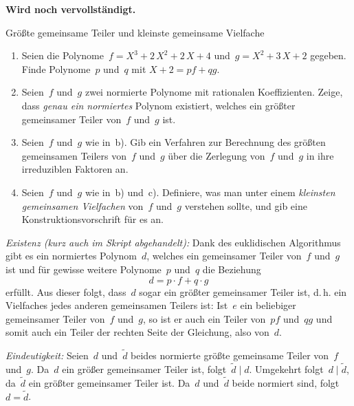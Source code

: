\documentclass{algblatt}
\begin{document}
\vspace*{-1.5cm}
\vspace*{-0.3cm}

\ifloesungen\begin{center}\textbf{Wird noch vervollständigt.}\end{center}\fi

\begin{aufgabe}{Größte gemeinsame Teiler und kleinste gemeinsame Vielfache}
\begin{enumerate}
\item Seien die Polynome~$f = X^3 + 2\,X^2 + 2\,X + 4$
und~$g = X^2 + 3\,X + 2$ gegeben. Finde Polynome~$p$ und~$q$ mit
$X+2 = p f + q g$.
\item Seien~$f$ und~$g$ zwei normierte Polynome mit rationalen
Koeffizienten. Zeige, dass \emph{genau ein normiertes} Polynom existiert, welches ein
größter gemeinsamer Teiler von~$f$ und~$g$ ist.
\item Seien~$f$ und~$g$ wie in~b).
Gib ein Verfahren zur Berechnung des größten gemeinsamen Teilers
von~$f$ und~$g$ über die Zerlegung von~$f$ und~$g$ in ihre
irreduziblen Faktoren an.
\item Seien~$f$ und~$g$ wie in~b) und~c). Definiere, was man unter einem
\emph{kleinsten gemeinsamen Vielfachen} von~$f$ und~$g$ verstehen sollte,
und gib eine Konstruktionsvorschrift für es an.
\end{enumerate}

\begin{loesungE}
\item

\item \emph{Existenz (kurz auch im Skript abgehandelt):} Dank des euklidischen
Algorithmus gibt es ein normiertes Polynom~$d$, welches ein gemeinsamer Teiler
von~$f$ und~$g$ ist und für gewisse weitere Polynome~$p$ und~$q$ die Beziehung
\[ d = p \cdot f + q \cdot g \]
erfüllt. Aus dieser folgt, dass~$d$ sogar ein größter gemeinsamer Teiler ist,
d.\,h. ein Vielfaches jedes anderen gemeinsamen Teilers ist: Ist~$e$ ein
beliebiger gemeinsamer Teiler von~$f$ und~$g$, so ist er auch ein Teiler
von~$pf$ und~$qg$ und somit auch ein Teiler der rechten Seite der Gleichung,
also von~$d$.

\emph{Eindeutigkeit:} Seien~$d$ und~$\widetilde d$ beides normierte
größte gemeinsame Teiler von~$f$ und~$g$. Da~$d$ ein größer gemeinsamer Teiler
ist, folgt~$\widetilde d \mid d$. Umgekehrt folgt~$d \mid \widetilde d$,
da~$\widetilde d$ ein größter gemeinsamer Teiler ist. Da~$d$ und~$\widetilde d$
beide normiert sind, folgt~$d = \widetilde d$.


\end{loesungE}
\end{aufgabe}
\end{document}
